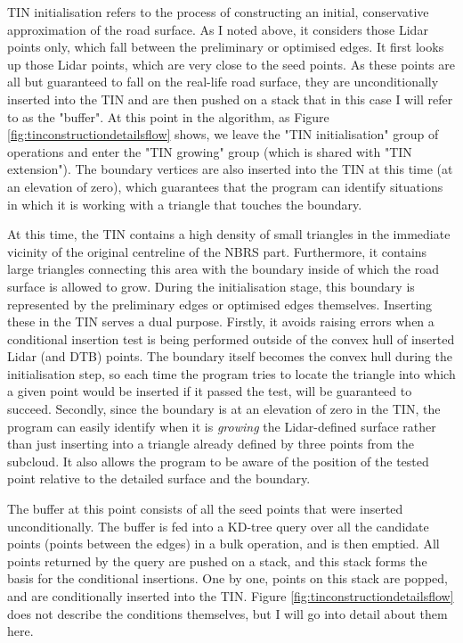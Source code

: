 TIN initialisation refers to the process of constructing an initial, conservative approximation of the road surface. As I noted above, it considers those Lidar points only, which fall between the preliminary or optimised edges. It first looks up those Lidar points, which are very close to the seed points. As these points are all but guaranteed to fall on the real-life road surface, they are unconditionally inserted into the TIN and are then pushed on a stack that in this case I will refer to as the "buffer". At this point in the algorithm, as Figure \ref{fig:tinconstructiondetailsflow} shows, we leave the "TIN initialisation" group of operations and enter the "TIN growing" group (which is shared with "TIN extension"). The boundary vertices are also inserted into the TIN at this time (at an elevation of zero), which guarantees that the program can identify situations in which it is working with a triangle that touches the boundary.

At this time, the TIN contains a high density of small triangles in the immediate vicinity of the original centreline of the NBRS part. Furthermore, it contains large triangles connecting this area with the boundary inside of which the road surface is allowed to grow. During the initialisation stage, this boundary is represented by the preliminary edges or optimised edges themselves. Inserting these in the TIN serves a dual purpose. Firstly, it avoids raising errors when a conditional insertion test is being performed outside of the convex hull of inserted Lidar (and DTB) points. The boundary itself becomes the convex hull during the initialisation step, so each time the program tries to locate the triangle into which a given point would be inserted if it passed the test, will be guaranteed to succeed. Secondly, since the boundary is at an elevation of zero in the TIN, the program can easily identify when it is \textit{growing} the Lidar-defined surface rather than just inserting into a triangle already defined by three points from the subcloud. It also allows the program to be aware of the position of the tested point relative to the detailed surface and the boundary.

The buffer at this point consists of all the seed points that were inserted unconditionally. The buffer is fed into a KD-tree query over all the candidate points (points between the edges) in a bulk operation, and is then emptied. All points returned by the query are pushed on a stack, and this stack forms the basis for the conditional insertions. One by one, points on this stack are popped, and are conditionally inserted into the TIN. Figure \ref{fig:tinconstructiondetailsflow} does not describe the conditions themselves, but I will go into detail about them here.

